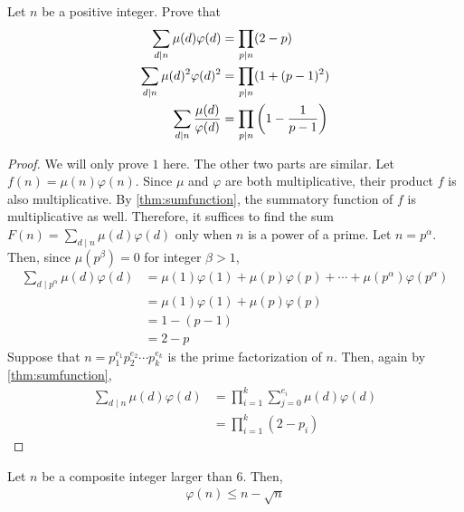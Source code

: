 	\begin{theorem}
		Let $n$ be a positive integer. Prove that
		\begin{align*}
			\sum_{d\mid n}\mu(d)\varphi(d)
				& = \prod_{p\mid n} (2-p)\\
			\sum_{d\mid n}\mu(d)^2\varphi(d)^2
				& =\prod_{p\mid n}(1+(p-1)^2)\\
			\sum_{d\mid n}\frac{\mu(d)}{\varphi(d)}
				& = \prod_{p\mid n}\left(1-\frac{1}{p-1}\right)
		\end{align*}
	\end{theorem}

	\begin{proof}
		We will only prove $1$ here. The other two parts are similar. Let $f(n)=\mu(n)\varphi(n)$. Since $\mu$ and $\varphi$ are both multiplicative, their product $f$ is also multiplicative. By \autoref{thm:sumfunction}, the summatory function of $f$ is multiplicative as well. Therefore, it suffices to find the sum $F(n)=\sum\limits_{d\mid n}\mu(d)\varphi(d)$ only when $n$ is a power of a prime. Let $n=p^\alpha$. Then, since $\mu(p^\beta)=0$ for integer $\beta > 1$,
			\begin{align*}
				\sum\limits_{d\mid p^\alpha}\mu(d)\varphi(d)
					&= \mu(1)\varphi(1) + \mu(p) \varphi(p) + \cdots + \mu(p^\alpha) \varphi(p^\alpha)\\
					&= \mu(1)\varphi(1) + \mu(p) \varphi(p) \\
					&= 1 - (p-1)\\
					&= 2 - p
			\end{align*}
		Suppose that $n=p_1^{e_1}p_2^{e_2} \cdots p_k^{e_k}$ is the prime factorization of $n$. Then, again by \autoref{thm:sumfunction},
		\begin{align*}
			\sum\limits_{d\mid n}\mu(d)\varphi(d)
				&= \prod_{i=1}^{k}\sum\limits_{j=0}^{e_i}\mu(d)\varphi(d)\\
				&= \prod_{i=1}^{k} (2-p_i)
		\end{align*}
	\end{proof}

	\begin{theorem}
		Let $n$ be a composite integer larger than $6$. Then,
			\begin{align*}
		 \varphi(n) \leq n - \sqrt n
			\end{align*}
	\end{theorem}

